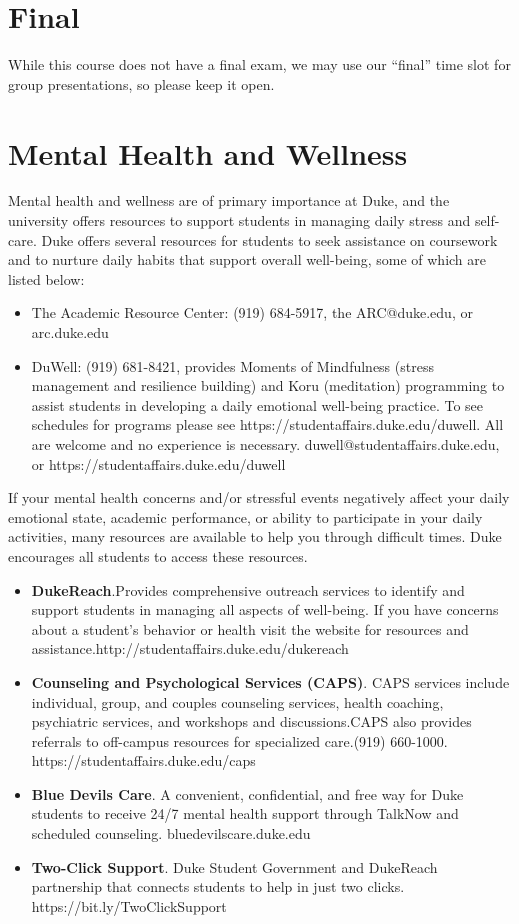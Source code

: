 \documentclass[12pt]{article}
\begin{document}
\section{Final}

While this course does not have a final exam, we may use our ``final'' time slot for group presentations, so please keep it open.

\section{Mental Health and Wellness}

Mental health and wellness are of primary importance at Duke, and the university offers resources to support students in managing daily stress and self-care. Duke offers several resources for students to seek assistance on coursework and to nurture daily habits that support overall well-being, some of which are listed below:

\begin{itemize}
	\item The Academic Resource Center: (919) 684-5917, the ARC@duke.edu, or arc.duke.edu
	\item DuWell: (919) 681-8421, provides Moments of Mindfulness (stress management and resilience building) and Koru (meditation) programming to assist students in developing a daily emotional well-being practice. To see schedules for programs please see https://studentaffairs.duke.edu/duwell. All are welcome and no experience is necessary. duwell@studentaffairs.duke.edu, or https://studentaffairs.duke.edu/duwell
\end{itemize}

If your mental health concerns and/or stressful events negatively affect your daily emotional state, academic performance, or ability to participate in your daily activities, many resources are available to help you through difficult times. Duke encourages all students to access these resources.

\begin{itemize}
	\item \textbf{DukeReach}.Provides comprehensive outreach services to identify and support students in managing all aspects of well-being. If you have concerns about a student's behavior or health visit the website for resources and assistance.http://studentaffairs.duke.edu/dukereach
	\item \textbf{Counseling and Psychological Services (CAPS)}. CAPS services include individual, group, and couples counseling services, health coaching, psychiatric services, and workshops and discussions.CAPS also provides referrals to off-campus resources for specialized care.(919) 660-1000. https://studentaffairs.duke.edu/caps
	\item \textbf{Blue Devils Care}. A convenient, confidential, and free way for Duke students to receive 24/7 mental health support through TalkNow and scheduled counseling. bluedevilscare.duke.edu
	\item \textbf{Two-Click Support}. Duke Student Government and DukeReach partnership that connects students to help in just two clicks.  https://bit.ly/TwoClickSupport
\end{itemize}
\end{document}
